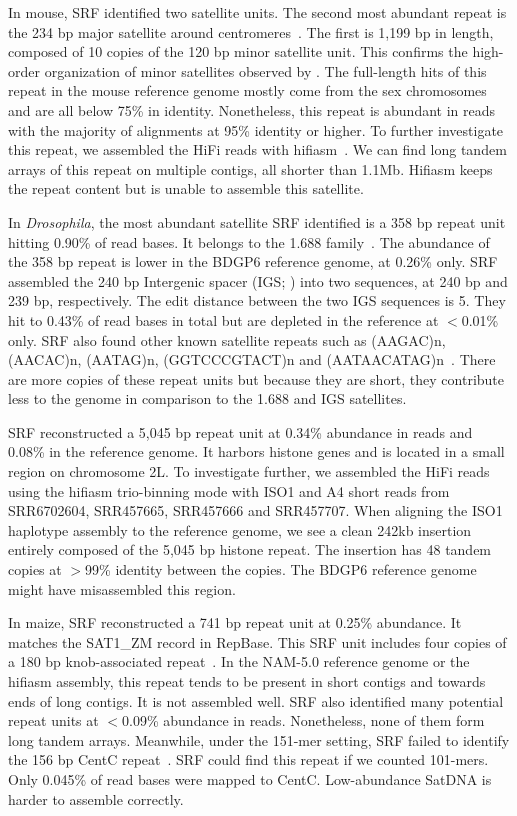\documentclass{bioinfo}
\begin{document}
In mouse, SRF identified two satellite units. The second most abundant repeat
is the 234 bp major satellite around
centromeres~\citep{Arora:2021aa,Thakur:2021aa}. The first is 1,199 bp in length,
composed of 10 copies of the 120 bp minor satellite unit. This confirms the
high-order organization of minor satellites observed by \citet{Pertile:2009aa}.
The full-length hits of this repeat in the mouse reference genome mostly come
from the sex chromosomes and are all below 75\% in identity.  Nonetheless, this
repeat is abundant in reads with the majority of alignments at 95\% identity or
higher. To further investigate this repeat, we assembled the HiFi reads with
hifiasm~\citep{Cheng:2021aa}. We can find long tandem arrays of this repeat on
multiple contigs, all shorter than 1.1Mb.  Hifiasm keeps the repeat content but
is unable to assemble this satellite.

In \emph{Drosophila}, the most abundant satellite SRF identified is a 358 bp
repeat unit hitting 0.90\% of read bases. It belongs to the 1.688
family~\citep{Khost:2017aa}. The abundance of the 358 bp repeat is lower in the
BDGP6 reference genome, at 0.26\% only. SRF assembled the 240 bp Intergenic
spacer (IGS; \citealt{Shatskikh:2020aa}) into two sequences, at 240 bp and
239 bp, respectively. The edit distance between the two IGS sequences is 5. They
hit to 0.43\% of read bases in total but are depleted in the reference at
$<$0.01\% only. SRF also found other known satellite repeats such as (AAGAC)n,
(AACAC)n, (AATAG)n, (GGTCCCGTACT)n and
(AATAACATAG)n~\citep{Shatskikh:2020aa,Thakur:2021aa}.  There are more copies of
these repeat units but because they are short, they contribute less to the
genome in comparison to the 1.688 and IGS satellites.

SRF reconstructed a 5,045 bp repeat unit at 0.34\% abundance in reads and
0.08\% in the reference genome. It harbors histone genes and is located in a
small region on chromosome 2L. To investigate further, we assembled the HiFi
reads using the hifiasm trio-binning mode with ISO1 and A4 short reads from
SRR6702604, SRR457665, SRR457666 and SRR457707. When aligning the ISO1
haplotype assembly to the reference genome, we see a clean 242kb insertion
entirely composed of the 5,045 bp histone repeat. The insertion has 48
tandem copies at $>$99\% identity between the copies. The BDGP6 reference genome might
have misassembled this region.

In maize, SRF reconstructed a 741 bp repeat unit at 0.25\% abundance. It matches
the SAT1\_ZM record in RepBase. This SRF unit includes four copies of a 180 bp
knob-associated repeat~\citep{Ananiev:1998ab}. In the NAM-5.0 reference genome
or the hifiasm assembly, this repeat tends to be present in short contigs and
towards ends of long contigs. It is not assembled well. SRF also identified
many potential repeat units at $<$0.09\% abundance in reads. Nonetheless, none
of them form long tandem arrays. Meanwhile, under the 151-mer setting, SRF failed to identify the 156 bp CentC
repeat~\citep{Ananiev:1998aa}. SRF could find this repeat if we counted
101-mers. Only 0.045\% of read bases were mapped to CentC. Low-abundance SatDNA
is harder to assemble correctly.
\end{document}
